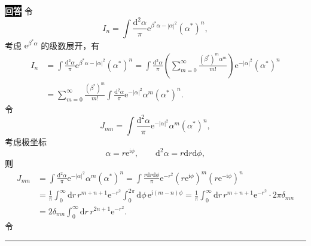 \documentclass[11pt,a4paper]{ctexart}
\newenvironment{answer}
  {\par\smallskip\noindent
   \begingroup
   \setlength{\fboxsep}{4pt}%
   \colorbox{black}{\textcolor{white}{\bfseries 回答}}%
   \endgroup
   \quad\ignorespaces}
  {\par\smallskip\noindent\rule{\linewidth}{0.4pt}\medskip}
\begin{document}
\begin{answer}
  令
  \begin{equation}
    I_n
    =\int\frac{\mathrm{d}^2\alpha}{\pi}\mathrm{e}^{\beta^*\alpha-\left|\alpha\right|^2}\left(\alpha^*\right)^n,
  \end{equation}
  考虑 $\mathrm{e}^{\beta^*\alpha} $ 的级数展开，有
  \begin{equation}
    \begin{aligned}
      I_n
      &=\int\frac{\mathrm{d}^2\alpha}{\pi}\mathrm{e}^{\beta^*\alpha-\left|\alpha\right|^2}\left(\alpha^*\right)^n
      =\int\frac{\mathrm{d}^2\alpha}{\pi} \left(\sum_{m=0}^{\infty} \frac{\left(\beta^* \right)^m \alpha^m }{m! }  \right) \mathrm{e}^{-\left|\alpha\right|^2}\left(\alpha^*\right)^n \\
      &=\sum_{m=0}^{\infty} \frac{\left(\beta^* \right)^m }{m! } \int \frac{\mathrm{d}^2 \alpha }{\pi } \mathrm{e}^{-\left|\alpha \right|^2} \alpha^m \left(\alpha^* \right)^n.
    \end{aligned}
  \end{equation}
  令
  \begin{equation}
    J_{mn}
    =\int \frac{\mathrm{d}^2 \alpha }{\pi } \mathrm{e}^{-\left|\alpha \right|^2} \alpha^m \left(\alpha^* \right)^n,
  \end{equation}
  考虑极坐标
  \begin{equation}
    \alpha=r\mathrm{e}^{\mathrm{i}\phi},\qquad
    \mathrm{d}^2\alpha = r\mathrm{d}r\mathrm{d}\phi,
  \end{equation}
  则
  \begin{equation}
    \begin{aligned}
      J_{mn}
      &=\int \frac{\mathrm{d}^2 \alpha }{\pi } \mathrm{e}^{-\left|\alpha \right|^2} \alpha^m \left(\alpha^* \right)^n
      =\int \frac{r\mathrm{d}r\mathrm{d}\phi }{\pi } \mathrm{e}^{-r^2} \left(r\mathrm{e}^{\mathrm{i}\phi} \right)^m \left(r\mathrm{e}^{-\mathrm{i}\phi} \right)^n \\
      &=\frac{1 }{\pi } \int_{0}^{\infty}\mathrm{d}r\, r^{m+n+1} \mathrm{e}^{-r^2} \int_{0}^{2\pi}\mathrm{d}\phi\, \mathrm{e}^{\mathrm{i}\left(m-n \right)\phi}
      =\frac{1 }{\pi } \int_{0}^{\infty}\mathrm{d}r\, r^{m+n+1} \mathrm{e}^{-r^2} \cdot 2\pi \delta_{mn} \\
      &=2\delta_{mn} \int_{0}^{\infty}\mathrm{d}r\, r^{2n+1} \mathrm{e}^{-r^2}.
    \end{aligned}
  \end{equation}
  令
  \begin{equation}

\end{equation}
\end{answer}
\end{document}
